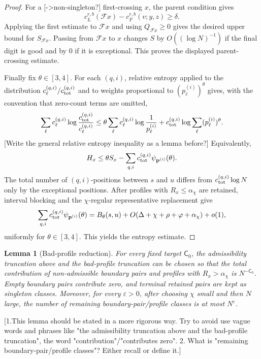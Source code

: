 \documentclass[11pt]{article}
\newtheorem{lem}{Lemma}
\newcommand{\bp}{\mathbf p}
\newcommand{\jscomment}[1]{\textup{\textsf{\color{blue}[#1]}}}
\begin{document}
\begin{proof}
For a \jscomment{->non-singleton?} first-crossing \(x\), the parent condition gives
\[
    c_L^{r,b}(\mathcal Fx)-c_F^{r,b}(v;y,z)\ge\delta .
\]
Applying the first estimate to \(\mathcal Fx\) and using
\(Q_{\mathcal Fx}\ge0\) gives the desired upper bound for
\(S_{\mathcal Fx}\). Passing from \(\mathcal Fx\) to \(x\) changes \(S\)
by \(O((\log N)^{-1})\) if the final digit is good and by \(0\) if it is
exceptional. This proves the displayed parent-crossing estimate.

Finally fix \(\theta\in[3,4]\). For each \((q,i)\), relative entropy
applied to the distribution
\(c_\ell^{(q,i)}/c_{\rm tot}^{(q,i)}\) and to weights proportional to
\((p_\ell^{(i)})^\theta\) gives, with the convention that zero-count
terms are omitted,
\[
    \sum_\ell c_\ell^{(q,i)}
        \log\frac{c_{\rm tot}^{(q,i)}}{c_\ell^{(q,i)}}
    \le
    \theta\sum_\ell c_\ell^{(q,i)}\log\frac1{p_\ell^{(i)}}
    +c_{\rm tot}^{(q,i)}
        \log\sum_\ell (p_\ell^{(i)})^\theta .
\]
\jscomment{Write the general relative entropy inequality as a lemma before?}
Equivalently,
\[
    H_x\le
    \theta S_x-\sum_{q,i}c_{\rm tot}^{(q,i)}\psi_{\bp^{(i)}}(\theta).
\]
The total number of \((q,i)\)-positions between \(s\) and \(u\) differs
from \(c_{\rm tot}^{(q,i)}\log N\) only by the exceptional positions.
After profiles with \(R_x\le\alpha_\chi\) are retained, interval
blocking and the \(\chi\)-regular representative replacement give
\[
    \sum_{q,i}c_{\rm tot}^{(q,i)}\psi_{\bp^{(i)}}(\theta)
    =
    B_\theta(s,u)+O(\Delta+\chi+\rho+\varphi+\alpha_\chi)+o(1),
\]
uniformly for \(\theta\in[3,4]\). This yields the entropy estimate.
\end{proof}

\begin{lem}[Bad-profile reduction]
For every fixed target \(\mathsf C_0\), the admissibility truncation above
and the bad-profile truncation can be chosen so that the total
contribution of non-admissible boundary pairs and profiles with
\(R_x>\alpha_\chi\) is \(N^{-\mathsf C_0}\). Empty boundary pairs
contribute zero, and terminal retained pairs are kept as singleton
classes. Moreover, for every \(\varepsilon>0\), after choosing \(\chi\)
small and then \(N\) large, the number of remaining
boundary-pair/profile classes is at most \(N^\varepsilon\).
\end{lem}

\jscomment{1.This lemma should be stated in a more rigorous way. Try to avoid use vague words and phrases like "the admissibility truncation above and the bad-profile truncation", the word "contribution"/"contributes zero". 2. What is "remaining boundary-pair/profile classes"? Either recall or define it.}
\end{document}
